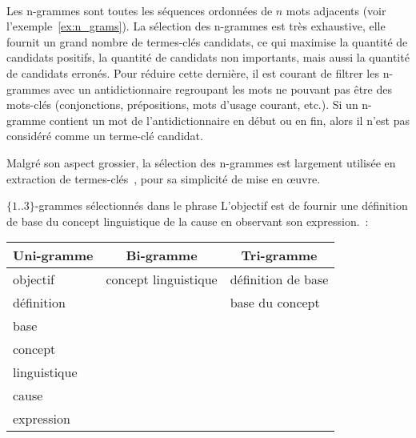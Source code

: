     ~\\Les n-grammes sont
    toutes les séquences ordonnées de $n$ mots adjacents (voir
    l'exemple~\ref{ex:n_grams}). La sélection des n-grammes est très exhaustive,
    elle fournit un grand nombre de termes-clés candidats, ce qui maximise la
    quantité de candidats positifs, la quantité de candidats non importants,
    mais aussi la quantité de candidats erronés. Pour réduire cette dernière, il
    est courant de filtrer les n-grammes avec un
    antidictionnaire regroupant les mots ne pouvant pas être des
    mots-clés (conjonctions, prépositions, mots d'usage courant, etc.). Si un
    n-gramme contient un mot de l'antidictionnaire en début ou en fin, alors il
    n'est pas considéré comme un terme-clé candidat.
    
    Malgré son aspect grossier, la sélection des n-grammes est largement
    utilisée en extraction de
    termes-clés~\cite{witten1999kea,hulth2003keywordextraction,medelyan2009humancompetitivetagging},
    pour sa simplicité de mise en \oe{}uvre.

    \begin{example}\label{ex:n_grams}
      $\{1..3\}$-grammes sélectionnés dans le phrase \og{}L'objectif est de
      fournir une définition de base du concept linguistique de la cause en
      observant son expression.\fg{}~:
      \begin{center}
        \begin{tabular}{l|l|l}
          \toprule
          \multicolumn{1}{c|}{\textbf{Uni-gramme}} & \multicolumn{1}{c|}{\textbf{Bi-gramme}} & \multicolumn{1}{c}{\textbf{Tri-gramme}}\\
          \hline
          \og{}objectif\fg{} & \og{}concept linguistique\fg{} & \og{}définition de base\fg{}\\
          \og{}définition\fg{} & & \og{}base du concept\fg{}\\
          \og{}base\fg{} & &\\
          \og{}concept\fg{} & &\\
          \og{}linguistique\fg{} & &\\
          \og{}cause\fg{} & &\\
          \og{}expression\fg{} & &\\
          \bottomrule
        \end{tabular}
      \end{center}\vspace{.25em}
    \end{example}

